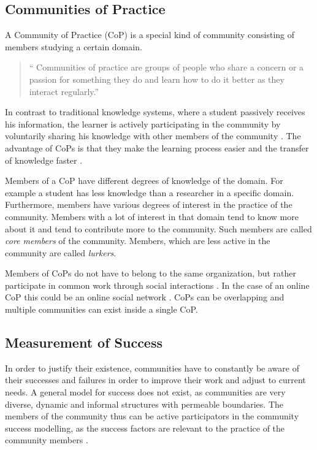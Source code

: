 \subsection{Communities of Practice}\label{sec:CoP}
A Community of Practice (CoP) is a special kind of community consisting of members studying a certain domain.
\begin{quote}
    ``
    Communities of practice are groups of people who share a concern or a passion for something they do and learn how to do it better as they interact regularly.''  \cite{Weng98}
\end{quote}
In contrast to traditional knowledge systems, where a student passively receives his information, the learner is actively participating in the community by voluntarily sharing his knowledge with other members of the community \cite{AMMi15,Kern08}.
The advantage of CoPs is that they make the learning process easier \cite{SaAr05} and the transfer of knowledge faster \cite{CuZe05}.

Members of a CoP have different degrees of knowledge of the domain.
For example a student has less knowledge than a researcher in a specific domain.
Furthermore, members have various degrees of interest in the practice of the community.
Members with a lot of interest in that domain tend to know more about it and tend to contribute more to the community.
Such members are called \emph{core members} of the community.
Members, which are less active in the community are called \emph{lurkers}.

Members of CoPs do not have to belong to the same organization, but rather participate in common work through social interactions \cite{Weng98}. In the case of an online CoP this could be an online social network \cite{CuZe05}. CoPs can be overlapping and multiple communities can exist inside a single CoP.

\subsection{Measurement of Success}
In order to justify their existence, communities have to constantly be aware of their successes and failures in order to improve their work and adjust to current needs.
A general model for success does not exist, as communities are very diverse, dynamic and informal structures with permeable boundaries.
The members of the community thus can be active participators in the community success modelling, as the success factors are relevant to the practice of the community members \cite{RKJa15}.

